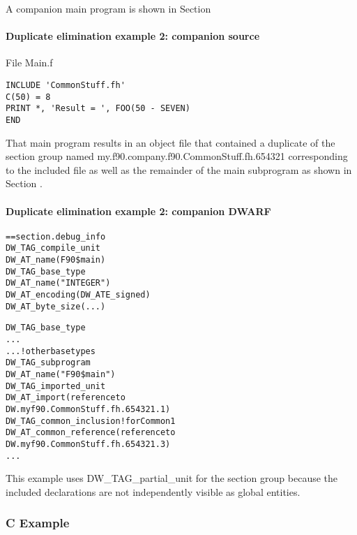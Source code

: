 A companion main program is shown in 
Section 

\paragraph{Duplicate elimination example 2: companion source }
\label{app:duplicateeliminationexample2companionsource}

File Main.f 

\begin{lstlisting}
INCLUDE 'CommonStuff.fh'
C(50) = 8
PRINT *, 'Result = ', FOO(50 - SEVEN)
END
\end{lstlisting}

That main program results in an object file that
contained a duplicate of the section group named
my.f90.company.f90.CommonStuff.fh.654321 
corresponding to the
included file as well as the remainder of the main subprogram
as shown in 
Section .

\paragraph{Duplicate elimination example 2: companion DWARF }
\label{app:duplicateeliminationexample2companiondwarf}

\begin{alltt}
== section .debug\_info
    DW\_TAG\_compile\_unit
        DW\_AT\_name(F90\$main)
        DW\_TAG\_base\_type
            DW\_AT\_name("INTEGER")
            DW\_AT\_encoding(DW\_ATE\_signed)
            DW\_AT\_byte\_size(...)

        DW\_TAG\_base\_type
            ...
        ...  ! other base types
        DW\_TAG\_subprogram
            DW\_AT\_name("F90\$main")
            DW\_TAG\_imported\_unit
                DW\_AT\_import(reference to
                    DW.myf90.CommonStuff.fh.654321.1)
            DW\_TAG\_common\_inclusion ! for Common1
                DW\_AT\_common\_reference(reference to
                    DW.myf90.CommonStuff.fh.654321.3)
            ...
\end{alltt}


This example uses DW\_TAG\_partial\_unit for the section group
because the included declarations are not independently
visible as global entities.


\subsubsection{C Example}

